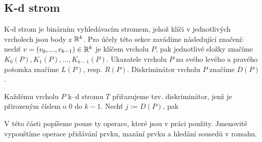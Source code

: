 \subsection{K-d strom}

K-d strom je binárním vyhledávacím stromem, jehož klíči v jednotlivých vrcholech jsou body z $\mathbb{R}{}^k$. Pro účely této sekce zavádíme následující značení: nechť $v = (v_0, ..., v_{k - 1})  \in \mathbb{R}^k$ je klíčem vrcholu $P$, pak jednotlivé složky značíme $K_0(P), K_1(P), \ldots, K_{k - 1}(P)$. Ukazatele vrcholu $P$ na svého levého a pravého potomka značíme $L(P)$, resp. $R(P)$. Diskriminátor vrcholu $P$ značíme $D(P)$.

Každému vrcholu $P$ k--d stromu $T$ přiřazujeme tzv. diskriminátor, jenž je přirozeným číslem o $0$ do $k - 1$. Nechť $j := D(P)$, pak 

V této části popíšeme pouze ty operace, které jsou v práci použity. Jmenovitě vypouštíme operace přidávání prvku, mazání prvku a hledání sousedů v rozsahu.

